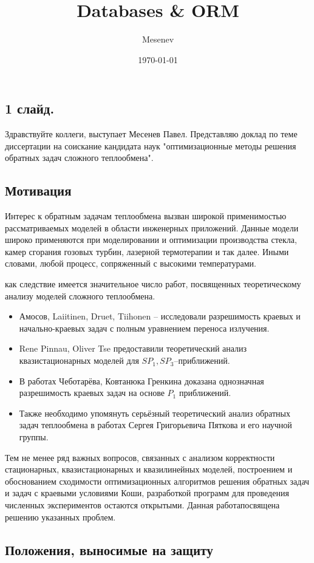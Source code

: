 \documentclass[8pt,a4paper]{article}
\title{Databases \& ORM}
\author{Mesenev}
\date{\today}
\begin{document}
    \subsection*{1 слайд.}
    Здравствуйте коллеги, выступает Месенев Павел.
    Представляю доклад по теме диссертации на соискание
    кандидата наук "оптимизационные методы решения обратных задач сложного теплообмена".


    \subsection*{Мотивация}
    Интерес к обратным задачам теплообмена вызван широкой применимостью рассматриваемых моделей в области инженерных приложений.
    Данные модели широко применяются при моделировании и оптимизации производства стекла, камер сгорания гозовых турбин, лазерной термотерапии и так далее. Иными словами, любой процесс, сопряженный с высокими температурами.

    как следствие имеется значительное число работ, посвященных теоретическому анализу моделей сложного теплообмена.
    \begin{itemize}
        \item Амосов, Laiitinen, Druet, Tiihonen -- исследовали разрешимость краевых и начально-краевых задач с полным уравнением переноса излучения.
        \item Rene Pinnau, Oliver Tse предоставили теоретический анализ квазистационарных моделей для $SP_1, SP_3$--приближений.
        \item В работах Чеботарёва, Ковтанюка Гренкина доказана однозначная разрешимость краевых задач на основе $P_1$ приближений.
        \item Также необходимо упомянуть серьёзный теоретический анализ обратных задач теплообмена в работах Сергея Григорьевича Пяткова и его научной группы.
    \end{itemize}

    Тем не менее ряд важных вопросов, связанных с анализом корректности стационарных, квазистационарных и квазилинейных моделей,
    построением и обоснованием сходимости оптимизационных алгоритмов решения обратных задач и задач с краевыми условиями Коши,
    разработкой программ для проведения численных экспериментов остаются открытыми.
    Данная работапосвящена решению указанных проблем.

    \vspace{10cm}
    \subsection*{Положения, выносимые на защиту}
\end{document}
